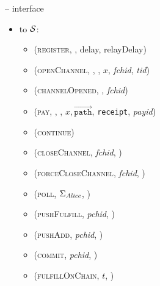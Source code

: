 \begin{figure}[H]
\begin{systembox}{\fpaynet{} -- interface}
\begin{itemize}
\begin{itemize}
          \item (\textsc{registerDone}, \alice, pubKey)
          \item (\textsc{corrupted}, \alice)
          \item (\textsc{channelAnnounced}, \alice, $p_{\alice, F}, p_{\bob,
          F}$, \textit{fchid}, \textit{pchid}, \textit{tid})
          \item (\textsc{update}, \texttt{receipt}, \alice)
          \item (\textsc{closedChannel}, \texttt{channel}, \alice)
          \item (\textsc{resolvePays}, \textit{payid}, \texttt{charged})
        \end{itemize}
        \item to $\mathcal{S}$:
        \begin{itemize}
          \item (\textsc{register}, \alice, delay, relayDelay)
          \item (\textsc{openChannel}, \alice, \bob, $x$, \textit{fchid},
          \textit{tid})
          \item (\textsc{channelOpened}, \alice, \textit{fchid})
          \item (\textsc{pay}, \alice, \bob, $x,
          \overrightarrow{\mathtt{path}}$, \texttt{receipt}, \textit{payid})
          \item (\textsc{continue})
          \item (\textsc{closeChannel}, \textit{fchid}, \alice)
          \item (\textsc{forceCloseChannel}, \textit{fchid}, \alice)
          \item (\textsc{poll}, $\Sigma_{\mathit{Alice}}$, \alice)
          \item (\textsc{pushFulfill}, \textit{pchid}, \alice)
          \item (\textsc{pushAdd}, \textit{pchid}, \alice)
          \item (\textsc{commit}, \textit{pchid}, \alice)
          \item (\textsc{fulfillOnChain}, $t$, \alice)
        \end{itemize}
      \end{itemize}
    \end{systembox}
    \caption{}
    \label{alg:fpaynet:interface}
  \end{figure}

